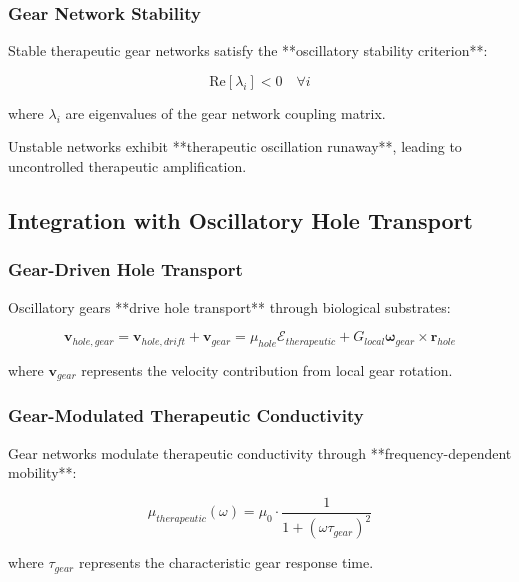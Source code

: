\subsubsection{Gear Network Stability}

Stable therapeutic gear networks satisfy the **oscillatory stability criterion**:

\begin{equation}
\text{Re}[\lambda_i] < 0 \quad \forall i
\end{equation}

where $\lambda_i$ are eigenvalues of the gear network coupling matrix.

Unstable networks exhibit **therapeutic oscillation runaway**, leading to uncontrolled therapeutic amplification.

\subsection{Integration with Oscillatory Hole Transport}

\subsubsection{Gear-Driven Hole Transport}

Oscillatory gears **drive hole transport** through biological substrates:

\begin{equation}
\mathbf{v}_{hole,gear} = \mathbf{v}_{hole,drift} + \mathbf{v}_{gear} = \mu_{hole} \mathcal{E}_{therapeutic} + G_{local} \boldsymbol{\omega}_{gear} \times \mathbf{r}_{hole}
\end{equation}

where $\mathbf{v}_{gear}$ represents the velocity contribution from local gear rotation.

\subsubsection{Gear-Modulated Therapeutic Conductivity}

Gear networks modulate therapeutic conductivity through **frequency-dependent mobility**:

\begin{equation}
\mu_{therapeutic}(\omega) = \mu_0 \cdot \frac{1}{1 + (\omega \tau_{gear})^2}
\end{equation}

where $\tau_{gear}$ represents the characteristic gear response time.

